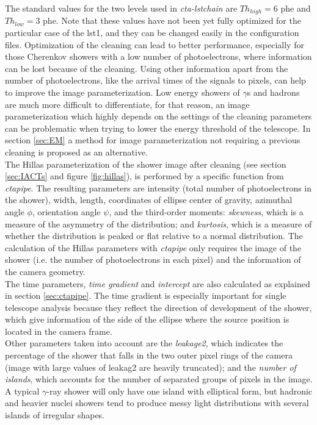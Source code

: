 \documentclass[main.tex]{subfiles}
\begin{document}
The standard values for the two levels used in \textit{cta-lstchain} are $Th_{high} = 6$ phe and $Th_{low} = 3$ phe. Note that these values have not been yet fully optimized for the particular case of the \gls{lst}1, and they can be changed easily in the configuration files. Optimization of the cleaning can lead to better performance, especially for those Cherenkov showers with a low number of photoelectrons, where information can be lost because of the cleaning. Using other information apart from the number of photoelectrons, like the arrival times of the signals to pixels, can help to improve the image parameterization. Low energy showers of $\gamma$s and hadrons are much more difficult to differentiate, for that reason, an image parameterization which highly depends on the settings of the cleaning parameters can be problematic when trying to lower the energy threshold of the telescope. In section \ref{sec:EM} a method for image parameterization not requiring a previous cleaning is proposed as an alternative.\\
The Hillas parameterization of the shower image after cleaning (see section \ref{sec:IACTs} and figure \ref{fig:hillas}), is performed by a specific function from \textit{ctapipe}. The resulting parameters are intensity (total number of photoelectrons in the shower), width, length, coordinates of ellipse center of gravity, azimuthal angle $\phi$, orientation angle $\psi$, and the third-order moments: \textit{skewness}, which is a measure of the asymmetry of the distribution; and \textit{kurtosis}, which is a measure of whether the distribution is peaked or flat relative to a normal distribution. The calculation of the Hillas parameters with \textit{ctapipe} only requires the image of the shower (i.e. the number of photoelectrons in each pixel) and the information of the camera geometry.\\
The time parameters, \textit{time gradient} and \textit{intercept} are also calculated as explained in section \ref{sec:ctapipe}. The time gradient is especially important for single telescope analysis because they reflect the direction of development of the shower, which give information of the side of the ellipse where the source position is located in the camera frame.\\
Other parameters taken into account are the \textit{leakage2}, which indicates the percentage of the shower that falls in the two outer pixel rings of the camera (image with large values of leakag2 are heavily truncated); and the \textit{number of islands}, which accounts for the number of separated groups of pixels in the image. A typical $\gamma$-ray shower will only have one island with elliptical form, but hadronic and heavier nuclei showers tend to produce messy light distributions with several islands of irregular shapes.\\
\end{document}
